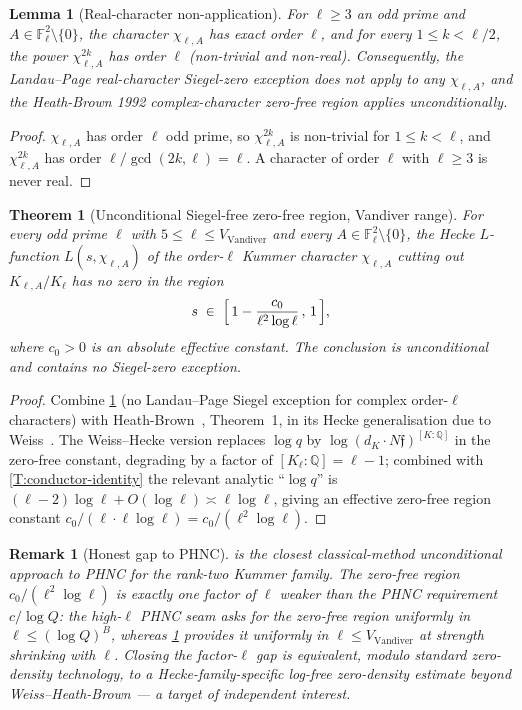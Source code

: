 \documentclass[11pt]{article}
\newtheorem{theorem}{Theorem}
\newtheorem{lemma}{Lemma}
\newtheorem{remark}{Remark}
\newcommand{\Q}{\mathbb Q}
\newcommand{\F}{\mathbb F}
\begin{document}
\begin{lemma}[Real-character non-application]\label{L:no-real-char}
For \(\ell\ge 3\) an odd prime and \(A\in\F_\ell^2\setminus\{0\}\), the character \(\chi_{\ell,A}\) has exact order \(\ell\), and for every \(1\le k<\ell/2\), the power \(\chi_{\ell,A}^{2k}\) has order \(\ell\) (non-trivial and non-real).  Consequently, the Landau--Page real-character Siegel-zero exception does not apply to any \(\chi_{\ell,A}\), and the Heath-Brown 1992 complex-character zero-free region applies unconditionally.
\end{lemma}

\begin{proof}
\(\chi_{\ell,A}\) has order \(\ell\) odd prime, so \(\chi_{\ell,A}^{2k}\) is non-trivial for \(1\le k<\ell\), and \(\chi_{\ell,A}^{2k}\) has order \(\ell/\gcd(2k,\ell)=\ell\).  A character of order \(\ell\) with \(\ell\ge 3\) is never real.
\end{proof}

\begin{theorem}[Unconditional Siegel-free zero-free region, Vandiver range]\label{T:siegel-free}
For every odd prime \(\ell\) with \(5\le\ell\le V_{\mathrm{Vandiver}}\) and every \(A\in\F_\ell^2\setminus\{0\}\), the Hecke \(L\)-function \(L(s,\chi_{\ell,A})\) of the order-\(\ell\) Kummer character \(\chi_{\ell,A}\) cutting out \(K_{\ell,A}/K_\ell\) has no zero in the region
\[
s\;\in\;\Bigl[\,1-\frac{c_0}{\ell^2\log\ell}\,,\,1\,\Bigr],
\]
where \(c_0>0\) is an absolute effective constant.  The conclusion is unconditional and contains no Siegel-zero exception.
\end{theorem}

\begin{proof}
Combine \cref{L:no-real-char} (no Landau--Page Siegel exception for complex order-\(\ell\) characters) with Heath-Brown~\cite{HeathBrown1992}, Theorem~1, in its Hecke generalisation due to Weiss~\cite{Weiss1980}.  The Weiss--Hecke version replaces \(\log q\) by \(\log(d_K\cdot N\mathfrak f)^{[K:\Q]}\) in the zero-free constant, degrading by a factor of \([K_\ell:\Q]=\ell-1\); combined with \cref{T:conductor-identity} the relevant analytic ``\(\log q\)'' is \((\ell-2)\log\ell+O(\log\ell)\asymp\ell\log\ell\), giving an effective zero-free region constant \(c_0/(\ell\cdot\ell\log\ell)=c_0/(\ell^2\log\ell)\).
\end{proof}

\begin{remark}[Honest gap to PHNC]\label{R:gap-to-phnc}
 is the closest classical-method unconditional approach to PHNC for the rank-two Kummer family.  The zero-free region \(c_0/(\ell^2\log\ell)\) is exactly one factor of \(\ell\) weaker than the PHNC requirement \(c/\log Q\): the high-\(\ell\) PHNC seam asks for the zero-free region uniformly in \(\ell\le(\log Q)^B\), whereas \cref{T:siegel-free} provides it uniformly in \(\ell\le V_{\mathrm{Vandiver}}\) at strength shrinking with \(\ell\).  Closing the factor-\(\ell\) gap is equivalent, modulo standard zero-density technology, to a Hecke-family-specific log-free zero-density estimate beyond Weiss--Heath-Brown — a target of independent interest.
\end{remark}
\end{document}
